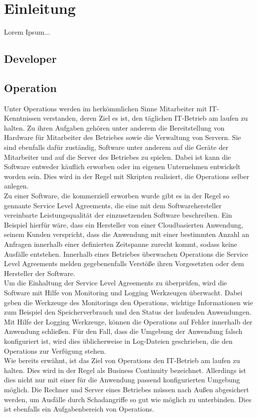 \chapter{Einleitung}
Lorem Ipsum...

\section{Developer}

\section{Operation}
Unter Operations werden im herkömmlichen Sinne Mitarbeiter mit IT-Kenntnissen verstanden, deren Ziel es ist, den täglichen IT-Betrieb am laufen zu halten. Zu ihren Aufgaben gehören unter anderem die Bereitstellung von Hardware für Mitarbeiter des Betriebes sowie die Verwaltung von Servern. Sie sind ebenfalls dafür zuständig, Software unter anderem auf die Geräte der Mitarbeiter und auf die Server des Betriebes zu spielen. Dabei ist kann die Software entweder käuflich erworben oder im eigenen Unternehmen entwickelt worden sein. Dies wird in der Regel mit Skripten realisiert, die Operations selber anlegen.\\
Zu einer Software, die kommerziell erworben wurde gibt es in der Regel so gennante Service Level Agreements, die eine mit dem Softwarehersteller vereinbarte Leistungsqualität der einzusetzenden Software beschreiben. Ein Beispiel hierfür wäre, dass ein Hersteller von einer Cloudbasierten Anwendung, seinem Kunden verspricht, dass die Anwendung mit einer bestimmten Anzahl an Anfragen innerhalb einer definierten Zeitspanne zurecht kommt, sodass keine Ausfälle entstehen. Innerhalb eines Betriebes überwachen Operations die Service Level Agreements melden gegebenenfalls Verstöße ihren Vorgesetzten oder dem Hersteller der Software. \\
Um die Einhaltung der Service Level Agreements zu überprüfen, wird die Software mit Hilfe von Monitoring und Logging Werkzeugen überwacht. Dabei geben die Werkzeuge des Monitorings den Operations, wichtige Informationen wie zum Beispiel den Speicherverbrauch und den Status der laufenden Anwendungen. Mit Hilfe der Logging Werkzeuge, können die Operations auf Fehler innerhalb der Anwendung schließen. Für den Fall, dass die Umgebung der Anwendung falsch konfiguriert ist, wird dies üblicherweise in Log-Dateien geschrieben, die den Operations zur Verfügung stehen. \\
Wie bereits erwähnt, ist das Ziel von Operations den IT-Betrieb am laufen zu halten. Dies wird in der Regel als Business Continuity bezeichnet. Allerdings ist dies nicht nur mit einer für die Anwendung passend konfigurierten Umgebung möglich. Die Rechner und Server eines Betriebes müssen nach Außen abgesichert werden, um Ausfälle durch Schadangriffe so gut wie möglich zu unterbinden. Dies ist ebenfalls ein Aufgabenbereich von Operations.

